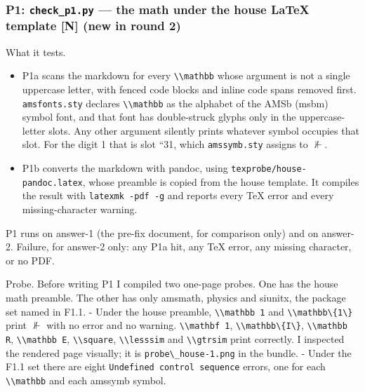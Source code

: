 \documentclass[11pt,a4paper]{article}
\providecommand{\tightlist}{\setlength{\itemsep}{0pt}\setlength{\parskip}{0pt}}
\newcommand{\passthrough}[1]{#1}
\begin{document}
\hypertarget{p1-check_p1.py-the-math-under-the-house-latex-template-n-new-in-round-2}{%
\subsubsection{\texorpdfstring{P1: \texttt{check\_p1.py} --- the math
under the house LaTeX template {[}N{]} (new in round
2)}{P1: check\_p1.py --- the math under the house LaTeX template {[}N{]} (new in round 2)}}\label{p1-check_p1.py-the-math-under-the-house-latex-template-n-new-in-round-2}}

What it tests.

\begin{itemize}
\tightlist
\item
  P1a scans the markdown for every \passthrough{\lstinline!\\mathbb!}
  whose argument is not a single uppercase letter, with fenced code
  blocks and inline code spans removed first.
  \passthrough{\lstinline!amsfonts.sty!} declares
  \passthrough{\lstinline!\\mathbb!} as the alphabet of the AMSb (msbm)
  symbol font, and that font has double-struck glyphs only in the
  uppercase-letter slots. Any other argument silently prints whatever
  symbol occupies that slot. For the digit 1 that is slot ``31, which
  \passthrough{\lstinline!amssymb.sty!} assigns to \(\nVdash\).
\item
  P1b converts the markdown with pandoc, using
  \passthrough{\lstinline!texprobe/house-pandoc.latex!}, whose preamble
  is copied from the house template. It compiles the result with
  \passthrough{\lstinline!latexmk -pdf -g!} and reports every TeX error
  and every missing-character warning.
\end{itemize}

P1 runs on answer-1 (the pre-fix document, for comparison only) and on
answer-2. Failure, for answer-2 only: any P1a hit, any TeX error, any
missing character, or no PDF.

Probe. Before writing P1 I compiled two one-page probes. One has the
house math preamble. The other has only amsmath, physics and siunitx,
the package set named in F1.1. - Under the house preamble,
\passthrough{\lstinline!\\mathbb 1!} and
\passthrough{\lstinline!\\mathbb\{1\}!} print \(\nVdash\) with no error
and no warning. \passthrough{\lstinline!\\mathbf 1!},
\passthrough{\lstinline!\\mathbb\{I\}!},
\passthrough{\lstinline!\\mathbb R!},
\passthrough{\lstinline!\\mathbb E!},
\passthrough{\lstinline!\\square!}, \passthrough{\lstinline!\\lesssim!}
and \passthrough{\lstinline!\\gtrsim!} print correctly. I inspected the
rendered page visually; it is
\passthrough{\lstinline!probe\_house-1.png!} in the bundle. - Under the
F1.1 set there are eight
\passthrough{\lstinline!Undefined control sequence!} errors, one for
each \passthrough{\lstinline!\\mathbb!} and each amssymb symbol.
\end{document}
